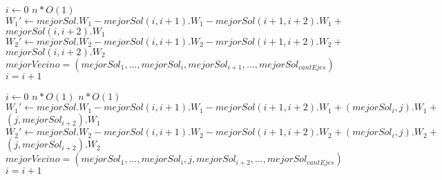 \begin{flushleft}
 \begin{figure}[H]
  \begin{pseudo}
   \State $i \leftarrow 0$
   \hfill$n*O(1)$
	  \State $W_1' \leftarrow mejorSol.W_1 - mejorSol(i,i+1).W_1 - mejorSol(i+1,i+2).W_1 + $
	  \State$mejorSol(i,i+2).W_1$
	  \State $W_2' \leftarrow mejorSol.W_2 - mejorSol(i,i+1).W_2 - mrjorSol(i+1,i+2).W_2 + $
	  \State $mejorSol(i,i+2).W_2$
	    \State $mejorVecino = (mejorSol_1, ... ,mejorSol_i, mejorSol_{i+1}, ..., mejorSol_{cantEjes})$
	  \EndIf
      \EndIf
      \State $i = i+1$
   \EndWhile
   \EndProcedure
  \end{pseudo}
 \end{figure}
\end{flushleft}

\begin{flushleft}
 \begin{figure}[H]
  \begin{pseudo}
   \State $i \leftarrow 0$
   \hfill$n*O(1)$
      \hfill$n*O(1)$
	  \State $W_1' \leftarrow mejorSol.W_1 - mejorSol(i,i+1).W_1 - mejorSol(i+1,i+2).W_1 + (mejorSol_i, j).W_1 + $
	  \State $(j, mejorSol_{i+2}).W_1$
	  \State $W_2' \leftarrow mejorSol.W_2 - mejorSol(i,i+1).W_2 - mejorSol(i+1,i+2).W_2 + (mejorSol_i, j).W_2 + $
	  \State $(j, mejorSol_{i+2}).W_2$
	    \State $mejorVecino = (mejorSol_1, ... ,mejorSol_i, j ,mejorSol_{i+2}, ..., mejorSol_{cantEjes})$
	  \EndIf
      \EndFor
      \State $i = i+1$
   \EndWhile
   \EndProcedure
  \end{pseudo}
 \end{figure}
\end{flushleft}


